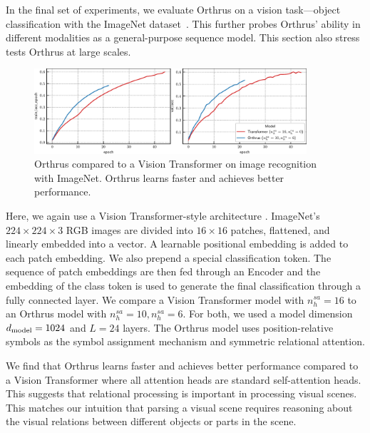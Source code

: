 In the final set of experiments, we evaluate Orthrus on a vision task---object classification with the ImageNet dataset~\citep{imagenet}. This further probes Orthrus' ability in different modalities as a general-purpose sequence model. This section also stress tests Orthrus at large scales.

\begin{figure}[ht]
    \centering
    \includegraphics[width=0.9\textwidth]{figs/experiments/imagenet/imagenet_acc_curves.pdf}
    \caption{Orthrus compared to a Vision Transformer on image recognition with ImageNet. Orthrus learns faster and achieves better performance.}
\end{figure}

Here, we again use a Vision Transformer-style architecture \citep{dosovitskiyImageWorth16x162020}. ImageNet's $224 \times 224 \times 3$ RGB images are divided into $16 \times 16$ patches, flattened, and linearly embedded into a vector. A learnable positional embedding is added to each patch embedding. We also prepend a special classification token. The sequence of patch embeddings are then fed through an Encoder and the embedding of the class token is used to generate the final classification through a fully connected layer. We compare a Vision Transformer model with $n_h^{sa} = 16$ to an Orthrus model with $n_h^{sa} = 10, n_h^{sa} = 6$. For both, we used a model dimension $d_{\mathrm{model}} = 1024$ and $L = 24$ layers. The Orthrus model uses position-relative symbols as the symbol assignment mechanism and symmetric relational attention.

We find that Orthrus learns faster and achieves better performance compared to a Vision Transformer where all attention heads are standard self-attention heads. This suggests that relational processing is important in processing visual scenes. This matches our intuition that parsing a visual scene requires reasoning about the visual relations between different objects or parts in the scene.